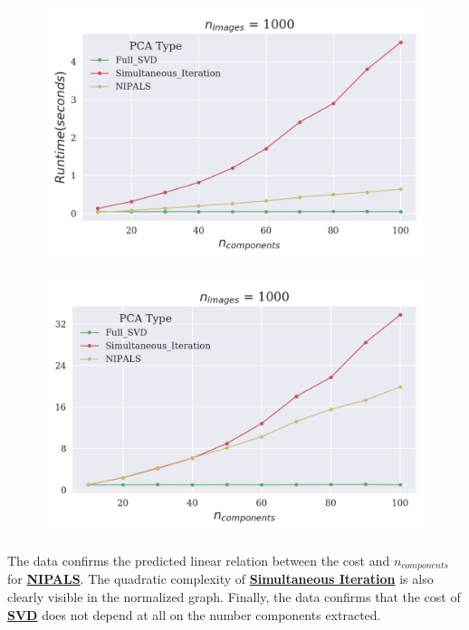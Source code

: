 \documentclass[12pt]{article}
\begin{document}
\begin{figure}[H]
\centering
\begin{minipage}{.45\textwidth}
  \centering
  \includegraphics[width=\linewidth]{UComponents.png}
  \label{UComponents}
\end{minipage}%
\quad
\begin{minipage}{.45\textwidth}
  \centering
  \includegraphics[width=\linewidth]{NComponents.png}
  \label{NComponents}
\end{minipage}
\end{figure}

The data confirms the predicted linear relation between the cost and $n_{components}$ for \textbf{\hyperref[3.1]{NIPALS}}. The quadratic complexity of \textbf{\hyperref[3.3]{Simultaneous Iteration}} is also clearly visible in the normalized graph. Finally, the data confirms that the cost of \textbf{\hyperref[3.2]{SVD}} does not depend at all on the number components extracted.
\end{document}
